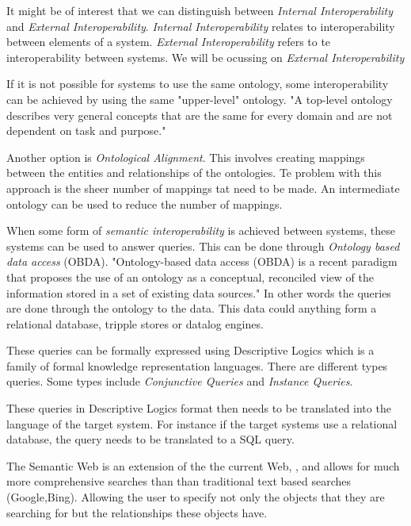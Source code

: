 \documentclass[12pt,a4paper]{article}
\begin{document}
It might be of interest that we can distinguish between \emph{Internal Interoperability} and \emph{External Interoperability}. \emph{Internal Interoperability} relates to interoperability between elements of a system. \emph{External Interoperability} refers to te interoperability between systems. \citep{Garcia2011} We will be ocussing on \emph{External Interoperability}

If it is not possible for systems to use the same ontology, some interoperability can be achieved by using the same "upper-level" ontology. "A top-level ontology describes very general concepts that are the same for every domain and are not dependent on task and purpose." \citep{VanDiggelen2007} 

Another option is \emph{Ontological Alignment}. This involves creating mappings between the entities and relationships of the ontologies. Te problem with this approach is the sheer number of mappings tat need to be made. \citep{VanDiggelen2007} An intermediate ontology can be used to reduce the number of mappings.\citep{Ciocoiu2000}\citep{VanDiggelen2007}

When some form of \emph{semantic interoperability} is achieved between systems, these systems can be used to answer queries.  This can be done through \emph{Ontology based data access} (OBDA). "Ontology-based data access (OBDA) is a recent paradigm that proposes the use of an ontology as a conceptual, reconciled view of the information stored in a set of existing data sources." \citep{Bien2015} In other words the queries are done through the ontology to the data. This data could anything form a relational database, tripple stores or datalog engines.\citep{RodMuro2013}

These queries can be formally expressed using Descriptive Logics which is a family of formal knowledge representation languages. There are different types queries. Some types include \emph{Conjunctive Queries} and \emph{Instance Queries}. \cite{Bien2015}
 
These queries in Descriptive Logics format then needs to be translated into the language of the target system. For instance if the target systems use a relational database, the query needs to be translated to a SQL query. \citep{kon2013}

The Semantic Web is an extension of the the current Web, \cite{lee2001}, and allows for much more comprehensive searches than than traditional text based searches (Google,Bing). Allowing the user to specify not only the objects that they are searching for but the relationships these objects have.


\end{document}
